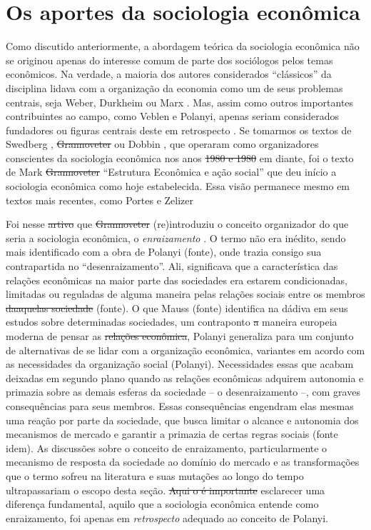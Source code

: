 \section{Os aportes da sociologia econômica}
Como discutido anteriormente, a abordagem teórica da 
sociologia econômica não se originou apenas do interesse
comum de parte dos sociólogos pelos temas econômicos.
Na verdade, a maioria dos autores considerados ``clássicos'' da disciplina lidava com a organização da economia como um de seus problemas centrais, seja Weber, Durkheim ou Marx . Mas, assim como outros importantes contribuintes ao campo, como Veblen e Polanyi,
apenas seriam considerados fundadores ou figuras centrais deste em
retrospecto . Se tomarmos os textos de Swedberg
, \sout{Grannoveter}  ou Dobbin , que operaram como organizadores conscientes da sociologia econômica nos anos \sout{1980 e 1980} em diante, foi o texto de Mark \sout{Grannoveter} ``Estrutura Econômica e ação social''  que deu início a sociologia econômica como hoje estabelecida. Essa visão permanece mesmo em textos mais recentes, como Portes e Zelizer 

Foi nesse \sout{artivo} que \sout{Grannoveter} (re)introduziu o conceito organizador do que
seria a sociologia econômica, o \emph{enraizamento} . O termo não era inédito, sendo mais identificado com a obra de Polanyi (fonte), onde trazia consigo sua contrapartida no
``desenraizamento''. Ali, significava que a característica das relações econômicas na maior parte das sociedades era estarem condicionadas, limitadas
ou reguladas de alguma maneira pelas relações sociais entre os membros
\sout{daaquelas sociedade} (fonte). O que Mauss (fonte) identifica na dádiva
em seus estudos sobre determinadas sociedades, um contraponto
\sout{a} maneira europeia moderna de pensar as \sout{relações econômica}, 
Polanyi generaliza para um conjunto de alternativas de se lidar com
a organização econômica, variantes em acordo com as necessidades da
organização social (Polanyi). Necessidades essas que acabam deixadas
em segundo plano quando as relações econômicas adquirem autonomia
e primazia sobre as demais esferas da sociedade -- o desenraizamento --, com graves consequências para seus membros. Essas consequências engendram elas mesmas uma reação por parte da sociedade, que busca limitar o alcance e autonomia dos mecanismos de mercado e garantir a primazia de certas regras sociais (fonte idem).
As discussões sobre o conceito de enraizamento, particularmente o mecanismo de resposta da sociedade ao domínio do mercado  e as transformações que o termo sofreu na literatura e suas mutações ao longo do tempo  ultrapassariam o escopo desta seção. \sout{Aqui o é importante} esclarecer uma diferença fundamental, aquilo que a sociologia econômica entende como enraizamento, foi apenas em \emph{retrospecto} adequado ao conceito de Polanyi.

